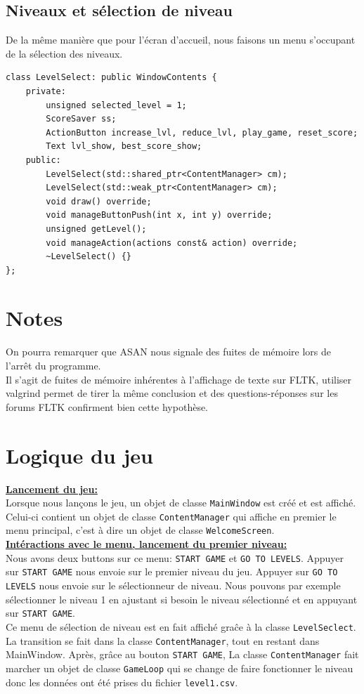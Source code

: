 \documentclass[a4paper, 12pt]{article}
\begin{document}
\subsection{Niveaux et sélection de niveau}

De la même manière que pour l'écran d'accueil, 
nous faisons un menu s'occupant de la sélection des niveaux.
\begin{lstlisting}
class LevelSelect: public WindowContents {
    private:
        unsigned selected_level = 1;
        ScoreSaver ss;
        ActionButton increase_lvl, reduce_lvl, play_game, reset_score;
        Text lvl_show, best_score_show;    
    public:
        LevelSelect(std::shared_ptr<ContentManager> cm);
        LevelSelect(std::weak_ptr<ContentManager> cm);
        void draw() override;
        void manageButtonPush(int x, int y) override;
        unsigned getLevel();
        void manageAction(actions const& action) override;
        ~LevelSelect() {}
};
\end{lstlisting}
\section{Notes}
On pourra remarquer que ASAN nous signale des fuites de mémoire lors de l'arrêt du programme. \\
Il s'agit de fuites de mémoire inhérentes à l'affichage de texte sur FLTK, utiliser valgrind permet de tirer la même conclusion et des questions-réponses sur les forums FLTK confirment bien cette hypothèse.
\pagebreak

\section{Logique du jeu}

\underline{\textbf{Lancement du jeu:}}  \vspace{0.1cm}\\
Lorsque nous lançons le jeu, un objet de classe \texttt{MainWindow} est créé 
et est affiché. 
Celui-ci contient un objet de classe \texttt{ContentManager} qui affiche en premier le
menu principal, c'est à dire un objet de classe \texttt{WelcomeScreen}. \\

\underline{\textbf{Intéractions avec le menu, lancement du premier niveau:}} \vspace{0.1cm} \\
Nous avons deux buttons sur ce menu: \texttt{START GAME} et \texttt{GO TO LEVELS}. 
Appuyer sur \texttt{START GAME} nous envoie sur le premier niveau du jeu.
Appuyer sur \texttt{GO TO LEVELS} nous envoie sur le sélectionneur de niveau.
Nous pouvons par exemple sélectionner le niveau 1 en ajustant si besoin le 
niveau sélectionné et en appuyant sur \texttt{START GAME}. \\
Ce menu de sélection de niveau est en fait affiché graĉe à la classe 
\texttt{LevelSeclect}.
La transition se fait dans la classe \texttt{ContentManager}, 
tout en restant dans MainWindow.
Après, grâce au bouton \texttt{START GAME},
La classe \texttt{ContentManager} fait marcher un objet de classe \texttt{GameLoop}
qui se change de faire fonctionner le niveau donc les données ont été prises du
fichier \texttt{level1.csv}. \\
\end{document}
